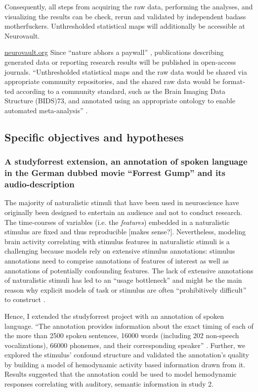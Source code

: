 %
Consequently, all steps from acquiring the raw data, performing the analyses,
and visualizing the results can be check, rerun and validated by independent
badass motherfuckers.
%
Unthresholded statistical maps will additionally be accessible at Neurovault.


\href{https://neurovault.org/}{neurovault.org}
%
Since ``nature abhors a paywall'' \citep{dupre2020nature}, publications
describing generated data or reporting research results will be published in
open-access journals.
%
``Unthresholded statistical maps and the raw data would be shared
via appropriate community repositories, and the shared raw data would be format­
ted according to a community standard, such as the Brain Imaging Data Structure
(BIDS)73, and annotated using an appropriate ontology to enable automated
meta-analysis'' \citep{poldrack2017scanning}.


\subsection{Specific objectives and hypotheses}


\subsubsection{A studyforrest extension, an annotation of spoken language in the
German dubbed movie ``Forrest Gump'' and its audio-description}

%
The majority of naturalistic stimuli that have been used in neuroscience have
originally been designed to entertain an audience and not to conduct research.
%
The time-courses of variables (i.e. the \textit{features}) embedded in a
naturalistic stimulus are fixed and thus reproducible [makes sense?].
%
Nevertheless, modeling brain activity correlating with stimulus features in
naturalistic stimuli is a challenging \citep{saarimaki2021naturalistic,
simony2020analysis} because models rely on  extensive stimulus annotations:
%
stimulus annotations need to comprise annotations of features of interest as
well as annotations of potentially confounding features.
%
The lack of extensive annotations of naturalistic stimuli has led to an ``usage
bottleneck'' \citep{aliko2020naturalistic} and might be the main reason why
explicit models of task or stimulus are often ``prohibitively difficult'' to
construct \citep{nastase2019measuring}.

Hence, I extended the studyforrest project with an annotation of spoken
language.
``The annotation provides information about the exact timing of each of the more
than 2500 spoken sentences, 16000 words (including 202 non-speech
vocalizations), 66000 phonemes, and their corresponding speaker''
\citep{haeusler2021speechanno}.
%
Further, we explored the stimulus' confound structure and validated the
annotation's quality by building a model of hemodynamic activity based
information drawn from it.
%
Results suggested that the annotation could be used to model hemodynamic
responses correlating with auditory, semantic information in study 2.


